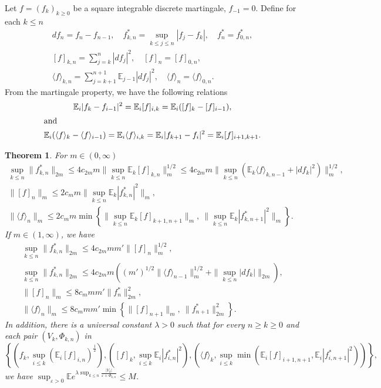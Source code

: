 \documentclass[12pt,oneside,reqno,fleqn]{amsart}
\numberwithin{equation}{section}
\newtheorem{theorem}{Theorem}[section]
\theoremstyle{remark}
\newcommand\mE{{\mathbb E}}
\newcommand\E{\mE}
\newcommand{\1}{{\mathbf 1}}
\newcommand{\wei}[1]{\langle#1\rangle}
\renewcommand{\le}{\leq}
\renewcommand{\ge}{\geq}
\begin{document}
	Let $f=(f_{k})_{k\ge0}$ be a square integrable discrete martingale, $f_{-1}=0$. Define for each $k\le n$
	\begin{gather*}
		df_n=f_n-f_{n-1},\quad f^*_{k,n}=\sup_{k\le j\le n}|f_j-f_k|, \quad f^*_n=f^*_{0,n},
		\\ [f]_{k,n}=\sum_{j=k}^{n}|df_j|^2, \quad [f]_n=[f]_{0,n},
		\\\wei{f}_{k,n}= \sum_{j=k+1}^{n+1}\E_{j-1}|df_j|^2,\quad \wei{f}_n=\wei{f}_{0,n}.
	\end{gather*}
	From the martingale property, we have the following relations 
	\begin{gather}\label{id.isometry}
	 	\E_i|f_k-f_{i-1}|^2= \E_i[f]_{i,k}=\E_i([f]_k-[f]_{i-1}),
	 	\\\shortintertext{and}
	 	\label{id.condiso}
	 	\E_{i}(\wei{f}_k-\wei{f}_{i-1})=\E_i\wei{f}_{i,k}=\E_i|f_{k+1}-f_i|^2=\E_i[f]_{i+1,k+1}.
	\end{gather}
	\begin{theorem}\label{thm.dismart}
		For $m\in(0,\infty)$
		\begin{gather}
			\sup_{k\le n}\|f^*_{k,n}\|_{2m}\le 4c_{2m}m\Big\|\sup_{k\le n}\E_k[f]_{k,n}\Big\|_{m}^{1/2}\le 4c_{2m}m\Big\|\sup_{k\le n}(\E_k\wei{f}_{k,n-1}+|df_k|^2)\Big\|_{m}^{1/2},
			\label{bdg.f10}
			\\\|[f]_{n}\|_m\le 2c_mm\Big\|\sup_{k\le n}\E_k|f^*_{k,n}|^2\Big\|_m,
			\label{bdg.fbk0}
			\\\|\wei{f}_{n}\|_m\le 2c_mm\min\left\{\Big\|\sup_{k\le n}\E_k[f]_{k+1,n+1}\Big\|_m,\ \Big\|\sup_{k\le n}\E_k|f^*_{k,n+1}|^2\Big\|_m\right\}.
			\label{bdg.fweisup0}
		\end{gather}
		If $m\in(1,\infty)$, we have
		\begin{gather}
			\sup_{k\le n}\|f^*_{k,n}\|_{2m}\le 4c_{2m}mm'\|[f]_{n}\|_{m}^{1/2},
			\label{bdg.f11}
			\\\sup_{k\le n}\|f^*_{k,n}\|_{2m}\le 4c_{2m}m\left((m')^{1/2}\|\wei{f}_{n-1}\|_{m}^{1/2}+\|\sup_{k\le n}|df_k|\|_{2m}\right),\label{bdg.rosenthal}
			\\\|[f]_n\|_m\le 8c_mmm'\|f^*_{n}\|^2_{2m},
			\label{bdg.fbk1}
			\\\|\wei{f}_n\|_m\le 8c_mmm'\min\left\{\|[f]_{n+1}\|_m,\ \|f^*_{n+1}\|^2_{2m}\right\}.
			\label{bdg.fweisup1}
		\end{gather}
		In addition, there is a universal constant $\lambda>0$ such that for every $n\ge k\ge0$ and each pair $(V_{k},\Phi_{k,n})$ in 
		$$
			\left\{\left(f_k,\sup_{i\le k}(\E_i[f]_{i,n})^{\frac12}\right),\left([f]_{k},\sup_{i\le k}\E_i|f^*_{i,n}|^2\right), \left(\wei{f}_{k},\sup_{i\le k}\min(\E_i[f]_{i+1,n+1},\E_i|f^*_{i,n+1}|^2)\right) \right\},
		$$
		we have $\sup_{\varepsilon>0}\E e^{\lambda\sup_{k\le n}\frac{|V_{k}|}{\varepsilon+\Phi_{k,n}}}\le M$.
	\end{theorem}
\end{document}
